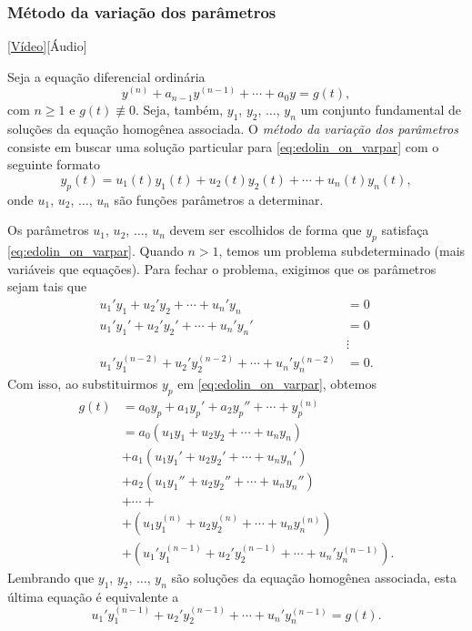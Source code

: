 \subsubsection{Método da variação dos parâmetros}

\begin{flushright}
  \href{https://archive.org/details/edo-ordem-n-mvp}{[Vídeo]}[Áudio]
\end{flushright}

Seja a equação diferencial ordinária
\begin{equation}\label{eq:edolin_on_varpar}
  y^{(n)} + a_{n-1}y^{(n-1)} + \cdots + a_0y = g(t),
\end{equation}
com $n\geq 1$ e $g(t)\not\equiv 0$. Seja, também, $y_1$, $y_2$, $\dotsc$, $y_n$ um conjunto fundamental de soluções da equação homogênea associada. O \emph{método da variação dos parâmetros} consiste em buscar uma solução particular para \eqref{eq:edolin_on_varpar} com o seguinte formato
\begin{equation}
  y_p(t) = u_1(t)y_1(t)+u_2(t)y_2(t)+\cdots +u_n(t)y_n(t),
\end{equation}
onde $u_1$, $u_2$, $\dotsc$, $u_n$ são funções parâmetros a determinar.

Os parâmetros $u_1$, $u_2$, $\dotsc$, $u_n$ devem ser escolhidos de forma que $y_p$ satisfaça \eqref{eq:edolin_on_varpar}. Quando $n>1$, temos um problema subdeterminado (mais variáveis que equações). Para fechar o problema, exigimos que os parâmetros sejam tais que
\begin{align}
  u_1'y_1+u_2'y_2+\cdots +u_n'y_n &= 0 \label{eq:edolin_on_varpar_eq0}\\
  u_1'y_1'+u_2'y_2'+\cdots +u_n'y_n' &= 0 \\
  &\vdots \\
  u_1'y_1^{(n-2)}+u_2'y_2^{(n-2)}+\cdots +u_n'y_n^{(n-2)} &= 0.\label{eq:edolin_on_varpar_eqn-1}
\end{align}
Com isso, ao substituirmos $y_p$ em \eqref{eq:edolin_on_varpar}, obtemos
\begin{align}
  g(t) &= a_0y_p+a_1y_p'+a_2y_p''+\cdots +y_p^{(n)}\\
       &= a_0(u_1y_1+u_2y_2+\cdots +u_ny_n) \\
       &+ a_1(u_1y_1'+u_2y_2'+\cdots +u_ny_n') \\
       &+ a_2(u_1y_1''+u_2y_2''+\cdots +u_ny_n'') \\
       &+ \cdots + \\
       &+ (u_1y_1^{(n)}+u_2y_2^{(n)}+\cdots +u_ny_n^{(n)}) \\
       &+ (u_1'y_1^{(n-1)}+u_2'y_2^{(n-1)}+\cdots +u_n'y_n^{(n-1)}).
\end{align}
Lembrando que $y_1$, $y_2$, $\dotsc$, $y_n$ são soluções da equação homogênea associada, esta última equação é equivalente a
\begin{equation}\label{eq:edolin_on_varpar_eqn}
  u_1'y_1^{(n-1)}+u_2'y_2^{(n-1)}+\cdots +u_n'y_n^{(n-1)} = g(t).
\end{equation}

